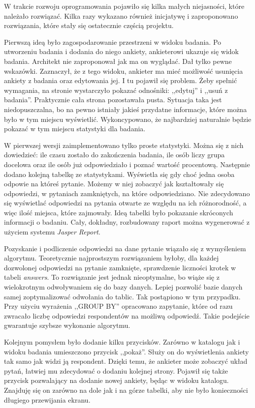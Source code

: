 \documentclass[12pt]{report}
\begin{document}
W trakcie rozwoju oprogramowania pojawiło się kilka małych niejasności, które należało rozwiązać. Kilka razy wykazano również inicjatywę i zaproponowano rozwiązania, które stały się ostatecznie częścią projektu.

Pierwszą ideą było zagospodarowanie przestrzeni w widoku badania. Po utworzeniu badania i dodania do niego ankiety, ankieterowi ukazuje się widok badania. Architekt nie zaproponował jak ma on wyglądać. Dał tylko pewne wskazówki. Zaznaczył, że z tego widoku, ankieter ma mieć możliwość usunięcia ankiety z badania oraz edytowania jej. I tu pojawił się problem. Żeby spełnić wymagania, na stronie wystarczyło pokazać odnośniki: ,,edytuj'' i ,,usuń z badania''. Praktycznie cała strona pozostawała pusta. Sytuacja taka jest niedopuszczalna, bo na pewno istniały jakieś przydatne informacje, które można było w tym miejscu wyświetlić. Wykoncypowano, że najbardziej naturalnie będzie pokazać w tym miejscu statystyki dla badania.

W pierwszej wersji zaimplementowano tylko proste statystyki. Można się z nich dowiedzieć: ile czasu zostało do zakończenia badania, ile osób liczy grupa docelowa oraz ile osób już odpowiedziało i poznać wartość procentową. Następnie dodano kolejną tabelkę ze statystykami. Wyświetla się gdy choć jedna osoba odpowie na któreś pytanie. Możemy w niej zobaczyć jak kształtowały się odpowiedzi, w pytaniach zamkniętych, na które odpowiedziano. Nie zdecydowano się wyświetlać odpowiedzi na pytania otwarte ze względu na ich różnorodność, a więc ilość miejsca, które zajmowały. Ideą tabelki było pokazanie skróconych informacji o badaniu. Cały, dokładny, rozbudowany raport można wygenerować z użyciem systemu \emph{Jasper Report}.

Pozyskanie i podliczenie odpowiedzi na dane pytanie wiązało się z wymyśleniem algorytmu. Teoretycznie najprostszym rozwiązaniem byłoby, dla każdej dozwolonej odpowiedzi na pytanie zamknięte, sprawdzenie liczności krotek w tabeli \emph{answers}. To rozwiązanie jest jednak nieoptymalne, bo wiąże się z wielokrotnym odwoływaniem się do bazy danych. Lepiej pozwolić bazie danych samej zoptymalizować odwołania do tablic. Tak postąpiono w tym przypadku. Przy użyciu wyrażenia ,,GROUP BY'' opracowano zapytanie, które od razu zwracało liczbę odpowiedzi respondentów na możliwą odpowiedź. Takie podejście gwarantuje szybsze wykonanie algorytmu.

Kolejnym pomysłem było dodanie kilku przycisków. Zarówno w katalogu jak i widoku badania umieszczono przycisk ,,pokaż''. Służy on do wyświetlenia ankiety tak samo jak widzi ją respondent. Dzięki temu, że ankieter może zobaczyć układ pytań, łatwiej mu zdecydować o dodaniu kolejnej strony. Pojawił się także przycisk pozwalający na dodanie nowej ankiety, będąc w widoku katalogu. Znajduję się on zarówno na dole jak i na górze tabelki, aby nie było konieczności długiego przewijania ekranu.
\end{document}
